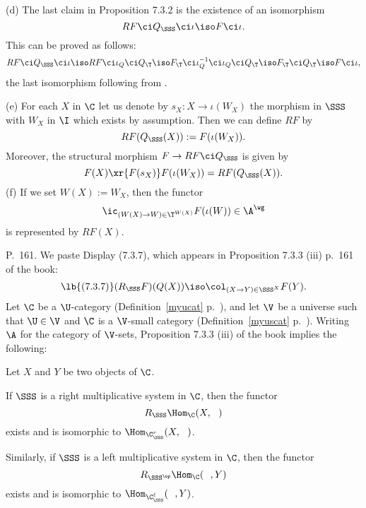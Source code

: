\documentclass[12pt]{article}
\theoremstyle{remark}
\theoremstyle{definition}
\begin{document}
\begin{s}
\nn(d) The last claim in Proposition 7.3.2 is the existence of an isomorphism 
$$
RF\ci Q_\SSS\ci\iota\iso F\ci\iota.
$$ 
This can be proved as follows: 
$$
RF\ci Q_\SSS\ci\iota\iso RF\ci\iota_Q\ci Q_\T\iso F_\T\ci\iota_Q^{-1}\ci\iota_Q\ci Q_\T\iso F_\T\ci Q_\T\iso F\ci\iota,
$$ 
the last isomorphism following from .

\nn(e) For each $X$ in $\C$ let us denote by $s_X:X\to\iota(W_X)$ the morphism in $\SSS$ with $W_X$ in $\I$ which exists by assumption. Then we can define $RF$ by 
$$
RF(Q_\SSS(X)):=F(\iota(W_X)).
$$ 
Moreover, the structural morphism $F\to RF\ci Q_\SSS$ is given by 
$$
F(X)\xr{F(s_X)}F(\iota(W_X))=RF(Q_\SSS(X)).
$$ 
(f) If we set $W(X):=W_X$, then the functor 
$$
\ic_{(W(X)\to W)\in\T^{W(X)}}F(\iota(W))\in\A^\wg
$$ 
is represented by $RF(X)$.


\end{s}


\begin{s}
P.~161. We paste Display (7.3.7), which appears in Proposition 7.3.3 (iii) p.~161 of the book: 
\begin{equation}\lb{(7.3.7)}
(R_\SSS F)(Q(X))\iso\col_{(X\to Y)\in\SSS^X}F(Y).
\end{equation} 
Let $\C$ be a $\U$-category (Definition~\ref{myucat} p.~), and let $\V$ be a universe such that $\U\in\V$ and $\C$ is a $\V$-small category (Definition~\ref{myuscat} p.~). Writing $\A$ for the category of $\V$-sets, Proposition 7.3.3 (iii) of the book implies the following:

Let $X$ and $Y$ be two objects of $\C$. 

If $\SSS$ is a right multiplicative system in $\C$, then the functor 
$$
R_\SSS\Hom_\C(X,\ \ )
$$ 
exists and is isomorphic to $\Hom_{\C_\SSS^r}(X,\ \ )$. 

Similarly, if $\SSS$ is a left multiplicative system in $\C$, then the functor 
$$
R_{\SSS^{\op}}\Hom_\C(\ \ ,Y)
$$ 
exists and is isomorphic to $\Hom_{\C_\SSS^\ell}(\ \ ,Y)$. 
\end{s}
\end{document}
